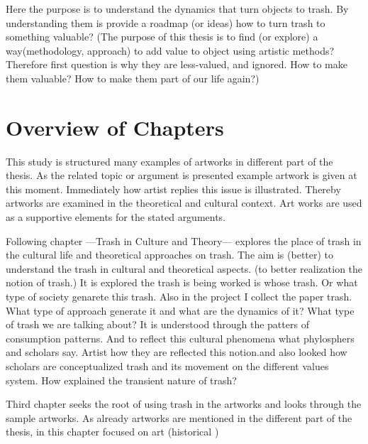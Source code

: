  Here the purpose is to understand the dynamics that turn objects to trash. By understanding them is provide a roadmap (or ideas) how to turn trash to something valuable? (The purpose of this thesis is to find (or explore) a way(methodology, approach) to add value to object using artistic methods? Therefore first question is why they are less-valued, and ignored. How to make them valuable? How to make them part of our life again?)

\section{Overview of Chapters}
This study is structured many examples of artworks in different part of the thesis. As the related topic or argument is presented example artwork is given at this moment. Immediately how artist replies this issue is illustrated. Thereby artworks are examined in the theoretical and cultural context. Art works are used as a supportive elements for the stated arguments.  

Following chapter ---Trash in Culture and Theory--- explores the place of trash in the cultural life and theoretical approaches on trash. The aim is (better) to understand the trash in cultural and theoretical aspects. (to better realization the notion of trash.) It is explored the trash is being worked is whose trash. Or what type of society genarete this trash. Also in the project I collect the paper trash. What type of approach generate it and what are the dynamics of it? What type of trash we are talking about? It is understood through the patters of consumption patterns. And to reflect this cultural phenomena what phylosphers and scholars say. Artist how they are reflected this notion.and also looked how scholars are conceptualized trash and its movement on the different values system. How explained the transient nature of trash?


Third chapter seeks the root of using trash in the artworks and looks through the sample artworks. As already artworks are mentioned in the different part of the thesis, in this chapter focused on art (historical )

